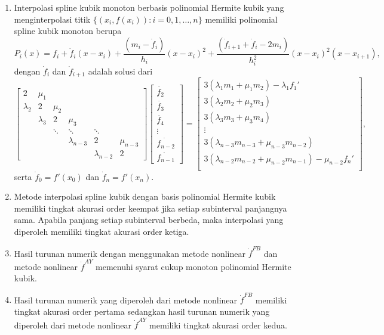 \begin{enumerate}
    \item Interpolasi spline kubik monoton berbasis polinomial Hermite kubik yang menginterpolasi titik $\{(x_i,f(x_i)): i = 0,1,\dots,n\}$ memiliki polinomial spline kubik monoton berupa
    \begin{equation*}
    P_i(x)=f_i + \dot{f}_i(x-x_i) + \frac{(m_i-\dot{f}_i)}{h_i}(x-x_i)^2 + \frac{(\dot{f}_{i+1}+\dot{f}_i-2m_i)}{h_i^2}(x-x_i)^2(x-x_{i+1}),
\end{equation*}
    dengan $\dot{f}_i$ dan $\dot{f}_{i+1}$ adalah solusi dari 
    \begin{equation*}
    \begin{bmatrix}
        2 & \mu_1 \\
        \lambda_2 & 2 & \mu_2 \\
        & \lambda_3 & 2 & \mu_3 \\
        && \ddots & \ddots & \ddots \\
        &&&\lambda_{n-3} & 2 & \mu_{n-3} \\
        &&&&\lambda_{n-2} & 2
    \end{bmatrix}
    \begin{bmatrix}
        \dot{f_2} \\
        \dot{f_3} \\
        \dot{f_4} \\
        \vdots \\
        \dot{f_{n-2}} \\
        \dot{f_{n-1}} 
    \end{bmatrix}=\begin{bmatrix}
        3(\lambda_1m_1 + \mu_1m_2) - \lambda_1f_1' \\
        3(\lambda_{2}m_{2} + \mu_{2}m_3) \\
        3(\lambda_{3}m_{3} + \mu_{3}m_4) \\
        \vdots \\
        3(\lambda_{n-3}m_{n-3} + \mu_{n-3}m_{n-2}) \\
        3(\lambda_{n-2}m_{n-2} + \mu_{n-2}m_{n-1}) - \mu_{n-2}f_n' \\
    \end{bmatrix},
\end{equation*}
    serta $\dot{f}_0 = f'(x_0)$ dan $\dot{f}_n = f'(x_n)$.

    \item Metode interpolasi spline kubik dengan basis polinomial Hermite kubik memiliki tingkat akurasi order keempat jika setiap subinterval panjangnya sama. Apabila panjang setiap subinterval berbeda, maka interpolasi yang diperoleh memiliki tingkat akurasi order ketiga.

    \item Hasil turunan numerik dengan menggunakan metode nonlinear $\dot{f}^{FB}$ dan metode nonlinear $\dot{f}^{AY}$ memenuhi syarat cukup monoton polinomial Hermite kubik.

    \item Hasil turunan numerik yang diperoleh dari metode nonlinear $\dot{f}^{FB}$ memiliki tingkat akurasi order pertama sedangkan hasil turunan numerik yang diperoleh dari metode nonlinear $\dot{f}^{AY}$ memiliki tingkat akurasi order kedua.
\end{enumerate}

